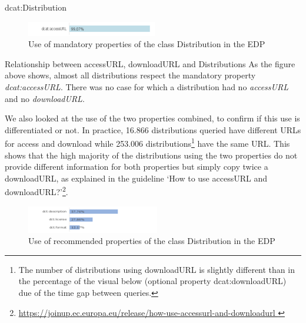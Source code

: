 \documentclass[<options>]{elsarticle}
\begin{document}
dcat:Distribution

\begin{figure}[!h]
\includegraphics{replace23.png}
\caption{Use of mandatory properties of the class Distribution in the EDP}
\end{figure}

Relationship between accessURL, downloadURL and Distributions
As the figure above shows, almost all distributions respect the mandatory property \textit{dcat:accessURL}. There was no case for which a distribution had no \textit{accessURL} and no \textit{downloadURL}.

We also looked at the use of the two properties combined, to confirm if this use is differentiated or not. In practice, 16.866 distributions queried have different URLs for access and download while 253.006 distributions\footnote{The number of distributions using downloadURL is slightly different than in the percentage of the visual below (optional property dcat:downloadURL) due of the time gap between queries.}  have the same URL. This shows that the high majority of the distributions using the two properties do not provide different information for both properties but simply copy twice a downloadURL, as explained in the guideline ‘How to use accessURL and downloadURL?’\footnote{\href{   https://joinup.ec.europa.eu/release/how-use-accessurl-and-downloadurl }{   https://joinup.ec.europa.eu/release/how-use-accessurl-and-downloadurl }}.

\begin{figure}[!h]
\includegraphics{replace24.png}
\caption{Use of recommended properties of the class Distribution in the EDP}
\end{figure}
\end{document}
